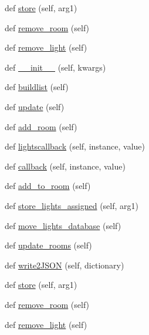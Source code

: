 \begin{DoxyCompactItemize}
\item 
def \hyperlink{classTestingGUI_1_1LightsView_a956aabd6c68ac0028a5dbc46ae9475ad}{store} (self, arg1)
\item 
def \hyperlink{classTestingGUI_1_1LightsView_a5f41c66493303b7174b335356d4deee5}{remove\+\_\+room} (self)
\item 
def \hyperlink{classTestingGUI_1_1LightsView_aa302b8817251a5f3c0f2c0d153073399}{remove\+\_\+light} (self)
\item 
def \hyperlink{classTestingGUI_1_1LightsView_ae63565dfb2328abb68fa8751284425a9}{\+\_\+\+\_\+init\+\_\+\+\_\+} (self, kwargs)
\item 
def \hyperlink{classTestingGUI_1_1LightsView_ad567fc119c87bdf050d2d105cffb102e}{buildlist} (self)
\item 
def \hyperlink{classTestingGUI_1_1LightsView_ae28189742abd26346c227385fe8866c7}{update} (self)
\item 
def \hyperlink{classTestingGUI_1_1LightsView_ab04e59790bba8440f9f1d65e84bc8ae6}{add\+\_\+room} (self)
\item 
def \hyperlink{classTestingGUI_1_1LightsView_abc44bd1d87c0d060890ad095b6195d27}{lightscallback} (self, instance, value)
\item 
def \hyperlink{classTestingGUI_1_1LightsView_a6868b6f77d43e03f6568b62169c9b19c}{callback} (self, instance, value)
\item 
def \hyperlink{classTestingGUI_1_1LightsView_a38460cbc7553198ef9a613d09919e077}{add\+\_\+to\+\_\+room} (self)
\item 
def \hyperlink{classTestingGUI_1_1LightsView_a3ff5b4674219060370bd91c84e99513c}{store\+\_\+lights\+\_\+assigned} (self, arg1)
\item 
def \hyperlink{classTestingGUI_1_1LightsView_ad2a97175fc114e694c6fe598361c6334}{move\+\_\+lights\+\_\+database} (self)
\item 
def \hyperlink{classTestingGUI_1_1LightsView_add6c257a4625658791c08aca275dbe4d}{update\+\_\+rooms} (self)
\item 
def \hyperlink{classTestingGUI_1_1LightsView_a363b48af2153effb586500f5ca0f371d}{write2\+J\+S\+ON} (self, dictionary)
\item 
def \hyperlink{classTestingGUI_1_1LightsView_a956aabd6c68ac0028a5dbc46ae9475ad}{store} (self, arg1)
\item 
def \hyperlink{classTestingGUI_1_1LightsView_a5f41c66493303b7174b335356d4deee5}{remove\+\_\+room} (self)
\item 
def \hyperlink{classTestingGUI_1_1LightsView_aa302b8817251a5f3c0f2c0d153073399}{remove\+\_\+light} (self)
\end{DoxyCompactItemize}
